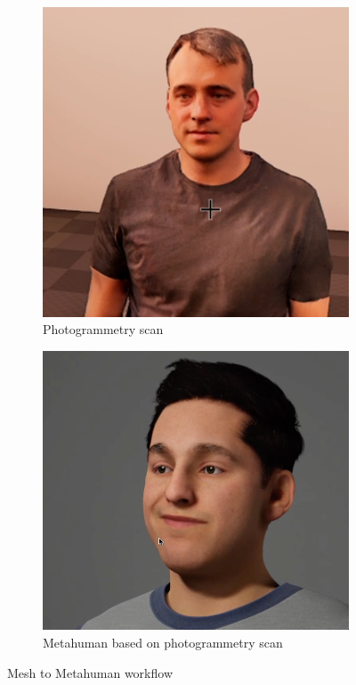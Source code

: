 \documentclass[
  a4paper,  %
  twoside,  %
  bibliography=totoc,
  headsepline,
  cleardoublepage=empty,
  parskip=half,
  draft=false
]{scrbook}
\begin{document}
\begin{figure}[h]
  \centering
  \begin{subfigure}[b]{0.45\textwidth}
    \includegraphics[width=\textwidth]{./graphics/images/photogrammetry.png}
    \caption{Photogrammetry scan}
    \label{fig:head-photogrammetry-scan}
  \end{subfigure}
  \hfill
  \begin{subfigure}[b]{0.5\textwidth}
    \includegraphics[width=\textwidth]{./graphics/images/Metahuman.png}
    \caption{Metahuman based on photogrammetry scan}
    \label{fig:metahuman-result}
  \end{subfigure}
  \caption{Mesh to Metahuman workflow}
  \label{fig:metahuman-comp}
\end{figure}
\end{document}
